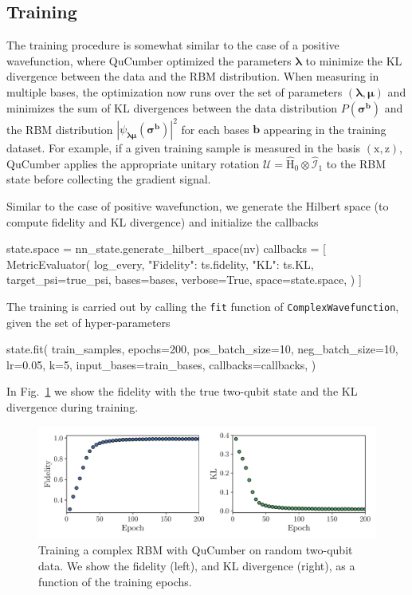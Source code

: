 \documentclass[submission, Phys, hidelnks]{SciPost}
\begin{document}
\subsection{Training}
The training procedure is somewhat similar to the case of a positive wavefunction, where QuCumber optimized the parameters $\bm{\lambda}$ to minimize the KL divergence between the data and the RBM distribution. When measuring in multiple bases, the optimization now runs over the set of parameters $(\bm{\lambda},\bm{\mu})$ and minimizes the sum of KL divergences between the data distribution $P(\bm{\sigma}^{\bm{b}})$ and the RBM distribution $|\psi_{\bm{\lambda\mu}}(\bm{\sigma}^{\bm{b}})|^2$ for each bases $\bm{b}$ appearing in the training dataset. For example, if a given training sample is measured in the basis $(\mathrm{x},\mathrm{z})$, QuCumber applies the appropriate unitary rotation $\bm{\mathcal{U}}=\hat{\mathrm{H}}_0\otimes\hat{\mathcal{I}}_1$ to the RBM state before collecting the gradient signal. 

Similar to the case of positive wavefunction, we generate the Hilbert space (to compute fidelity and KL divergence) and initialize the callbacks
\begin{python}
state.space = nn_state.generate_hilbert_space(nv)
callbacks = [
  MetricEvaluator(
    log_every,
    {"Fidelity": ts.fidelity, "KL": ts.KL},
    target_psi=true_psi,
    bases=bases,
    verbose=True,
    space=state.space,
  )
]

\end{python}
The training is carried out by calling the \verb|fit| function of \verb|ComplexWavefunction|, given the set of hyper-parameters
\begin{python}
state.fit(
    train_samples,
    epochs=200,
    pos_batch_size=10,
    neg_batch_size=10,
    lr=0.05,
    k=5,
    input_bases=train_bases,
    callbacks=callbacks,
)
\end{python}

In Fig.~\ref{fig:complex} we show the fidelity with the true two-qubit state and the KL divergence during training. 
\begin{figure}[htb]
    \centering{}
    \includegraphics[width=\textwidth]{plots/complex_fid_KL.pdf}
    \caption{\label{fig:complex} Training a complex RBM with QuCumber on random two-qubit data. We show the fidelity (left), and KL divergence (right), as a function of the training epochs.}
\end{figure}
\end{document}
